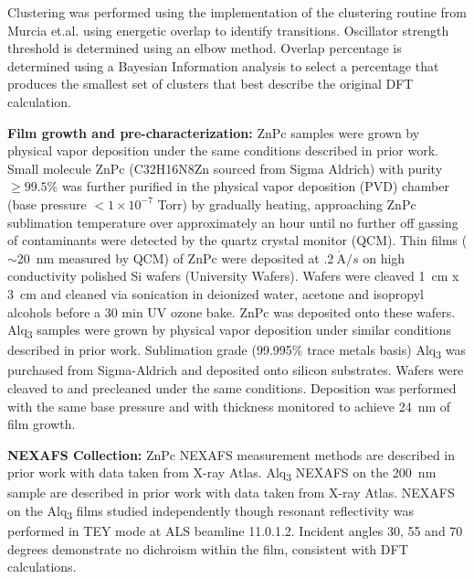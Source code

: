 Clustering was performed using the  implementation of the clustering routine from Murcia et.al. using energetic overlap to identify transitions.\autocite{murciaQuantitativeBondTraceableResonant2026,victormurciaWSUCarbonLabDFTClustering2025} Oscillator strength threshold is determined using an elbow method. Overlap percentage is determined using a Bayesian Information analysis to select a percentage that produces the smallest set of clusters that best describe the original DFT calculation.

\textbf{Film growth and pre-characterization:} ZnPc samples were grown by physical vapor deposition under the same conditions described in prior work.\autocite{zotero-item-2198} Small molecule ZnPc (C32H16N8Zn sourced from Sigma Aldrich) with purity \(\geq 99.5\%\) was further purified in the physical vapor deposition (PVD) chamber (base pressure \(< 1 \times 10^{- 7}\) Torr) by gradually heating, approaching ZnPc sublimation temperature over approximately an hour until no further off gassing of contaminants were detected by the quartz crystal monitor (QCM). Thin films (\({\sim}\)\qty{20}{nm} measured by QCM) of ZnPc were deposited at \(.2\ \mathring{\mathrm{A}}/s\) on high conductivity polished Si wafers (University Wafers). Wafers were cleaved \qty{1}{cm} x \qty{3}{cm} and cleaned via sonication in deionized water, acetone and isopropyl alcohols before a 30 min UV ozone bake. ZnPc was deposited onto these wafers. Alq\textsubscript{3} samples were grown by physical vapor deposition under similar conditions described in prior work.\autocite{ferronCompositionDictatesMolecular2023} Sublimation grade (99.995\% trace metals basis) Alq\textsubscript{3} was purchased from Sigma-Aldrich and deposited onto silicon substrates. Wafers were cleaved to and precleaned under the same conditions. Deposition was performed with the same base pressure and with thickness monitored to achieve \qty{24}{nm} of film growth.

\textbf{NEXAFS Collection:} ZnPc NEXAFS measurement methods are described in prior work with data taken from X-ray Atlas.\autocite{atlas_10_5281_zenodo_22742990} Alq\textsubscript{3} NEXAFS on the \qty{200}{nm} sample are described in prior work with data taken from X-ray Atlas.\autocite{ferronCompositionDictatesMolecular2023} NEXAFS on the Alq\textsubscript{3} films studied independently though resonant reflectivity was performed in TEY mode at ALS beamline 11.0.1.2. Incident angles 30, 55 and 70 degrees demonstrate no dichroism within the film, consistent with DFT calculations.

